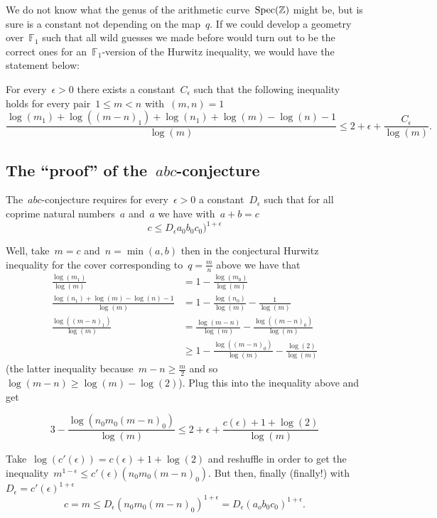 We do not know what the genus of the arithmetic curve~$\operatorname{Spec}(\mathbb{Z})$ might be, but is sure is a constant not depending on the map~$q$. If we could develop a geometry over~$\mathbb{F}_1$ such that all wild guesses we made before would turn out to be the correct ones for an~$\mathbb{F}_1$-version of the Hurwitz inequality, we would have the statement below:

For every~$\epsilon > 0$ there exists a constant~$C_\epsilon$ such that the following inequality holds for every pair~$1 \leq m < n$ with~$(m,n)=1$
\begin{equation}
  \frac{\log(m_1) + \log((m-n)_1) + \log(n_1) + \log(m)-\log(n)-1}{\log(m)} \leq 2 + \epsilon + \frac{C_\epsilon}{\log(m)}.
\end{equation}

\subsection{The ``proof'' of the~$abc$-conjecture}

The~$abc$-conjecture requires for every~$\epsilon > 0$ a constant~$D_\epsilon$ such that for all coprime natural numbers~$a$ and~$a$ we have with~$a+b=c$
\begin{equation}
c \leq D_\epsilon a_0b_0c_0)^{1+\epsilon}
\end{equation}

Well, take~$m=c$ and~$n=\min(a,b)$ then in the conjectural Hurwitz inequality for the cover corresponding to~$q=\frac{m}{n}$ above we have that
\begin{equation}
  \begin{aligned}
    \frac{\log(m_1)}{\log(m)} &= 1 - \frac{\log(m_0)}{\log(m)} \\
    \frac{\log(n_1)+\log(m)-\log(n)-1}{\log(m)} &= 1 - \frac{\log(n_0)}{\log(m)} - \frac{1}{\log(m)} \\
    \frac{\log((m-n)_1)}{\log(m)}&=\frac{\log(m-n)}{\log(m)}-\frac{\log((m-n)_0)}{\log(m)} \\
    &\geq 1 - \frac{\log((m-n)_0)}{\log(m)} - \frac{\log(2)}{\log(m)}
  \end{aligned}
\end{equation}
(the latter inequality because~$m-n \geq \frac{m}{2}$ and so~$\log(m-n) \geq \log(m)-\log(2)$). Plug this into the inequality above and get

\begin{equation}
  3-\frac{\log(n_0m_0(m-n)_0)}{\log(m)} \leq 2 + \epsilon + \frac{c(\epsilon) + 1 + \log(2)}{\log(m)}
\end{equation}

Take~$\log(c'(\epsilon))=c(\epsilon)+1+\log(2)$ and reshuffle in order to get the inequality~$m^{1-\epsilon} \leq c'(\epsilon)(n_0m_0(m-n)_0)$. But then, finally (finally!) with~$D_\epsilon=c'(\epsilon)^{1+\epsilon}$
\begin{equation}
  c=m \leq D_\epsilon(n_0m_0(m-n)_0)^{1+\epsilon} = D_\epsilon(a_ob_0c_0)^{1+\epsilon}.
\end{equation}
